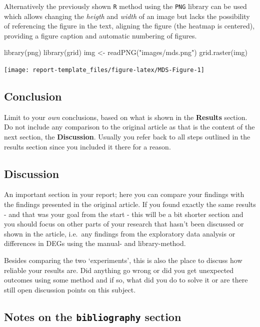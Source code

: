 \newpage

Alternatively the previously shown \texttt{R} method using the
\texttt{PNG} library can be used which allows changing the \emph{heigth}
and \emph{width} of an image but lacks the possibility of referencing
the figure in the text, aligning the figure (the heatmap is centered),
providing a figure caption and automatic numbering of figures.

\begin{Schunk}
\begin{Sinput}
library(png)
library(grid)
img <- readPNG("images/mds.png")
grid.raster(img)
\end{Sinput}

\texttt{[image: report-template\_files/figure-latex/MDS-Figure-1]} \end{Schunk}

\subsection{Conclusion}\label{conclusion}

Limit to your \emph{own} conclusions, based on what is shown in the
\textbf{Results} section. Do not include any comparison to the original
article as that is the content of the next section, the
\textbf{Discussion}. Usually you refer back to all steps outlined in the
results section since you included it there for a reason.

\subsection{Discussion}\label{discussion}

An important section in your report; here you can compare your findings
with the findings presented in the original article. If you found
exactly the same results - and that was your goal from the start - this
will be a bit shorter section and you should focus on other parts of
your research that hasn't been discussed or shown in the article,
i.e.~any findings from the exploratory data analysis or differences in
DEGs using the manual- and library-method.

Besides comparing the two `experiments', this is also the place to
discuss how reliable your results are. Did anything go wrong or did you
get unexpected outcomes using some method and if so, what did you do to
solve it or are there still open discussion points on this subject.

\subsection{\texorpdfstring{Notes on the \texttt{bibliography}
section}{Notes on the bibliography section}}\label{notes-on-the-bibliography-section}

